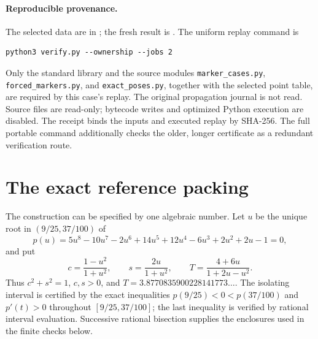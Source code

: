 \documentclass[11pt]{article}
\begin{document}
\paragraph{Reproducible provenance.}
The selected data are in
;
the fresh result is .
The uniform replay command is
\begin{verbatim}
python3 verify.py --ownership --jobs 2
\end{verbatim}
Only the standard library and the source modules
\texttt{marker\_cases.py}, \texttt{forced\_markers.py}, and
\texttt{exact\_poses.py}, together with the selected point table, are
required by this case's replay. The original propagation journal is not
read. Source files are read-only; bytecode writes and optimized Python
execution are disabled. The receipt binds the inputs and executed replay
by SHA-256. The full portable command additionally checks the older,
longer certificate as a redundant verification route.


\section{The exact reference packing}
\label{construction:exact}

The construction can be specified by one algebraic number.  Let $u$ be the
unique root in $(9/25,37/100)$ of
\[
 p(u)=5u^8-10u^7-2u^6+14u^5+12u^4-6u^3+2u^2+2u-1=0,
\]
and put
\[
 c=\frac{1-u^2}{1+u^2},\qquad
 s=\frac{2u}{1+u^2},\qquad
 T=\frac{4+6u}{1+2u-u^2}.
\]
Thus $c^2+s^2=1$, $c,s>0$, and
$T=3.8770835900228141773\ldots$.  The isolating interval is certified by
the exact inequalities $p(9/25)<0<p(37/100)$ and $p'(t)>0$ throughout
$[9/25,37/100]$; the last inequality is verified by rational interval
evaluation.  Successive rational bisection supplies the enclosures used in
the finite checks below.
\end{document}
